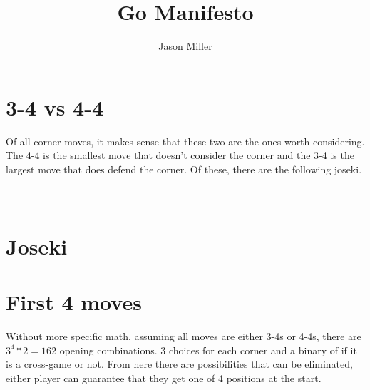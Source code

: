 \documentclass[12pt]{IEEEtran}
\title{Go Manifesto}
\author{Jason Miller}
\begin{document}
\maketitle
\tableofcontents


\section{3-4 vs 4-4}
Of all corner moves, it makes sense that these two are the ones worth considering. The 4-4 is the smallest move that doesn't consider the corner and the 3-4 is the largest move that does defend the corner. Of these, there are the following joseki. 
\showgoban[a1,l7]
\\
\cleargoban
{}
\showgoban[a1,l7]
\\
\cleargoban
{}
\showgoban[a1,l7]
\\
\cleargoban
{}
\showgoban[a1,l7]


\section{Joseki}

\section{First 4 moves}
Without more specific math, assuming all moves are either 3-4s or 4-4s, there are $3^4 * 2 = 162$ opening combinations. 3 choices for each corner and a binary of if it is a cross-game or not. From here there are possibilities that can be eliminated, either player can guarantee that they get one of 4 positions at the start.\\ 
\cleargoban
{}
\showfullgoban
\\
\cleargoban
{}
\showfullgoban
\end{document}
